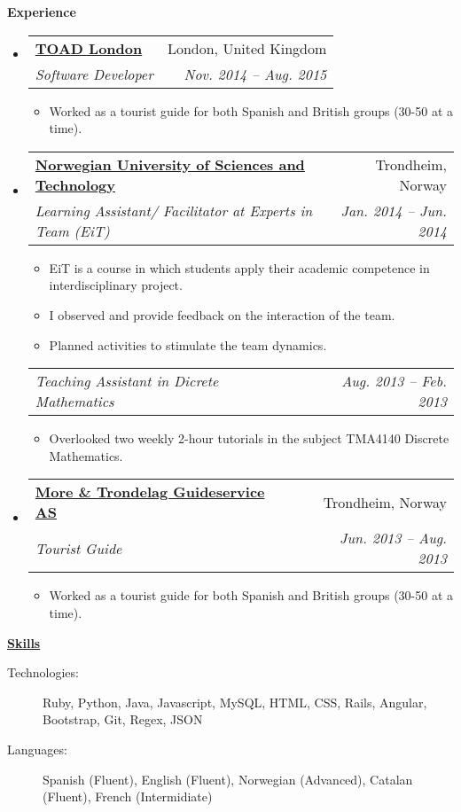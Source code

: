 \documentclass[letterpaper,11pt]{article}
\makeatletter
\newcommand{\resitem}[1]{\item #1 \vspace{-2pt}}
\newcommand{\resheading}[1]{{\large \colorbox{mygrey}{\begin{minipage}{\textwidth}{\textbf{#1 \vphantom{p\^{E}}}}\end{minipage}}}}
\newcommand{\ressubheading}[4]{
\begin{tabular*}{6.5in}{l@{\extracolsep{\fill}}r}
        \textbf{#1} & #2 \\
        \textit{#3} & \textit{#4} \\
\end{tabular*}\vspace{-6pt}}
\newcommand{\ressubsubheading}[2]{
\begin{tabular*}{6.5in}{l@{\extracolsep{\fill}}r}
        \textit{#1} & \textit{#2} \\
\end{tabular*}\vspace{-6pt}}
\makeatother
\begin{document}
\resheading{Experience}
    \begin{itemize}
        \item
            \ressubheading{\href{http://www.embeddedarm.com}{TOAD London}}{London, United Kingdom}{Software Developer}{Nov. 2014 -- Aug. 2015}
                { \footnotesize
                \begin{itemize}
                    \resitem{Worked as a tourist guide for both Spanish and British groups (30-50 at a time).}
                \end{itemize}
                }
        \item
            \ressubheading{\href{http://www.oracle.com}{Norwegian University of Sciences and Technology}}{Trondheim, Norway}
                {Learning Assistant/ Facilitator at Experts in Team (EiT)}{Jan. 2014 -- Jun. 2014}
                { \footnotesize
                \begin{itemize}
                    \resitem{EiT is a course in which students apply their academic competence in interdisciplinary project.}
                    \resitem{I observed and provide feedback on the interaction of the team.}
                    \resitem{Planned activities to stimulate the team dynamics.}
                \end{itemize}
                }

            \ressubsubheading{Teaching Assistant in Dicrete Mathematics}{Aug. 2013 -- Feb. 2013}
                { \footnotesize
                \begin{itemize}
                    \resitem{Overlooked two weekly 2-hour tutorials in the subject TMA4140 Discrete Mathematics.}
                \end{itemize}
                }

        \item
            \ressubheading{\href{http://www.embeddedarm.com}{More \& Trondelag Guideservice AS}}{Trondheim, Norway}{Tourist Guide}{Jun. 2013 -- Aug. 2013}
                { \footnotesize
                \begin{itemize}
                    \resitem{Worked as a tourist guide for both Spanish and British groups (30-50 at a time).}
                \end{itemize}
                }

    \end{itemize}  %

\resheading{\href{http://www.derekhildreth.com/portfolio.php}{Skills}}
    \begin{description}
        \item[Technologies:] { \footnotesize Ruby, Python, Java, Javascript, MySQL, HTML, CSS, Rails, Angular, Bootstrap, Git, Regex, JSON}

        \item[Languages:] { \footnotesize
            Spanish (Fluent), English (Fluent), Norwegian (Advanced), Catalan (Fluent), French (Intermidiate)
        }

    \end{description} %
\end{document}
